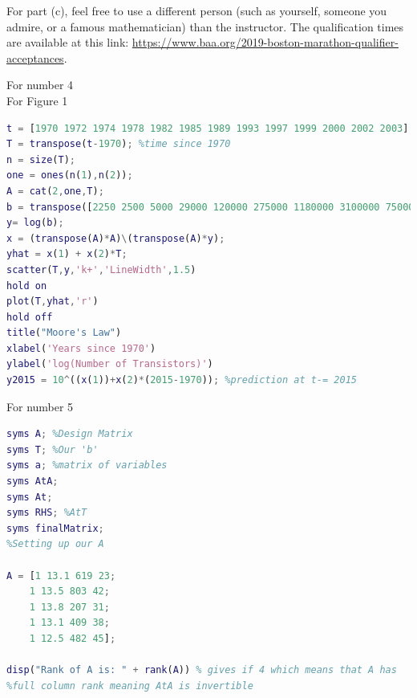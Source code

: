 \documentclass[answers,10pt]{exam}
\begin{document}
\begin{questions}
For part (c), feel free to use a different person (such as yourself, someone you admire, or a famous mathematician) than the instructor. The qualification times are available at this link: \url{https://www.baa.org/2019-boston-marathon-qualifier-acceptances}.

\begin{solution}
For number 4
$$ $$
For Figure 1
\begin{lstlisting}[language = Matlab]
t = [1970 1972 1974 1978 1982 1985 1989 1993 1997 1999 2000 2002 2003]; %years
T = transpose(t-1970); %time since 1970
n = size(T);
one = ones(n(1),n(2));
A = cat(2,one,T);
b = transpose([2250 2500 5000 29000 120000 275000 1180000 3100000 7500000 24000000 42000000 220000000 410000000]);
y= log(b);
x = (transpose(A)*A)\(transpose(A)*y);
yhat = x(1) + x(2)*T;
scatter(T,y,'k+','LineWidth',1.5)
hold on
plot(T,yhat,'r')
hold off
title("Moore's Law")
xlabel('Years since 1970')
ylabel('log(Number of Transistors)')
y2015 = 10^((x(1))+x(2)*(2015-1970)); %prediction at t-= 2015

\end{lstlisting}
For number 5
\begin{lstlisting}[language = Matlab]
%%
syms A; %Design Matrix
syms T; %Our 'b'
syms a; %matrix of variables
syms AtA;
syms At;
syms RHS; %AtT
syms finalMatrix;
%Setting up our A

A = [1 13.1 619 23;
    1 13.5 803 42;
    1 13.8 207 31;
    1 13.1 409 38;
    1 12.5 482 45];

disp("Rank of A is: " + rank(A)) % gives if 4 which means that A has 
%full column rank meaning AtA is invertible



\end{lstlisting}
\end{solution}
\end{questions}
\end{document}
